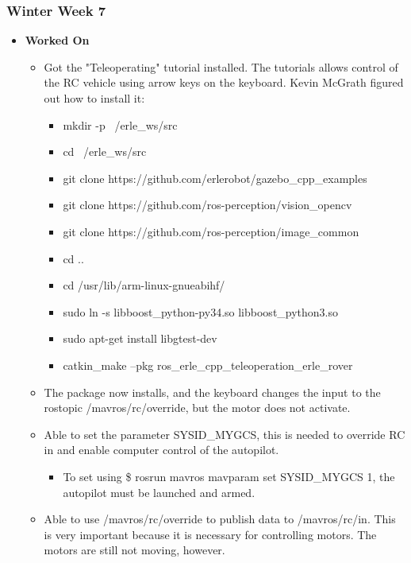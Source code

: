 \documentclass[compsoc,draftclsnofoot,onecolumn,10pt]{IEEEtran}
\begin{document}
\subsubsection{Winter Week 7}
\begin{itemize}
    \item {\textbf{Worked On}}
    \begin{itemize}
        \item Got the "Teleoperating" tutorial installed. The tutorials allows control of the RC vehicle using arrow keys on the keyboard. Kevin McGrath figured out how to install it:
        \begin{itemize}
            \item mkdir -p ~/erle\_ws/src
            \item cd ~/erle\_ws/src
            \item git clone https://github.com/erlerobot/gazebo\_cpp\_examples
            \item git clone https://github.com/ros-perception/vision\_opencv
            \item git clone https://github.com/ros-perception/image\_common
            \item cd ..
            \item cd /usr/lib/arm-linux-gnueabihf/
            \item sudo ln -s libboost\_python-py34.so libboost\_python3.so
            \item sudo apt-get install libgtest-dev
            \item catkin\_make --pkg ros\_erle\_cpp\_teleoperation\_erle\_rover
        \end{itemize}

        \item The package now installs, and the keyboard changes the input to the rostopic /mavros/rc/override, but the motor does not activate.

        \item Able to set the parameter SYSID\_MYGCS, this is needed to override RC in and enable computer control of the autopilot.
        \begin{itemize}
            \item To set using \$ rosrun mavros mavparam set SYSID\_MYGCS 1, the autopilot must be launched and armed.
        \end{itemize}
        \item Able to use /mavros/rc/override to publish data to /mavros/rc/in. This is very important because it is necessary for controlling motors. The motors are still not moving, however.


\end{itemize}
\end{itemize}
\end{document}
